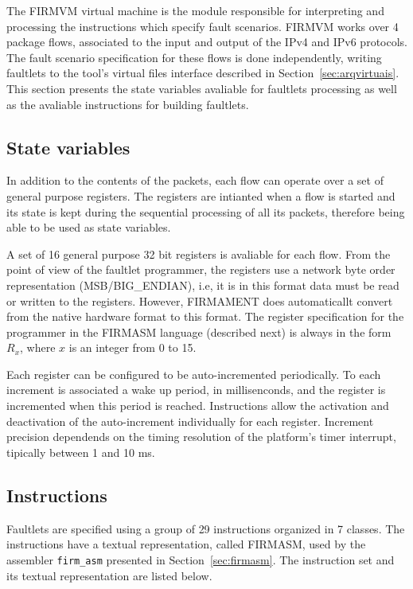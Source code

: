 \documentclass[11pt]{article}
\begin{document}
The \textsf{FIRMVM} virtual machine is the module responsible for interpreting and processing the instructions which specify fault scenarios. \textsf{FIRMVM} works over 4 package flows, associated to the input and output of the IPv4 and IPv6 protocols. The fault scenario specification for these flows is done independently, writing faultlets to the tool's virtual files interface described in Section~\ref{sec:arqvirtuais}. This section presents the state variables  avaliable for faultlets processing as well as the avaliable instructions for building faultlets.

\subsection{State variables}
 
In addition to the contents of the packets, each flow can operate over a set of general purpose registers. The registers are intianted when a flow is started and its state is kept during the sequential processing of all its packets, therefore being able to be used as state variables. 

A set of 16 general purpose 32 bit registers is avaliable for each flow. From the point of view of the faultlet programmer, the registers use a network byte order representation (MSB/BIG\_ENDIAN), i.e, it is in this format data must be read or written to the registers. However, \textsf{FIRMAMENT} does automaticallt convert from the native hardware format to this format. The register specification for the programmer in the \textsf{FIRMASM} language (described next) is always in the form $R_x$, where $x$ is an integer from 0 to 15.

Each register can be configured to be auto-incremented periodically. To each increment is associated a wake up period, in millisenconds, and the register is incremented when this period is reached. Instructions allow the activation and deactivation of the auto-increment individually for each register. Increment precision dependends on the timing resolution of the platform's timer interrupt, tipically between 1 and 10 ms.

\subsection{Instructions}

Faultlets are specified using a group of 29 instructions organized in 7 classes. The instructions have a textual representation, called \textsf{FIRMASM}, used by the assembler \texttt{firm\_asm} presented in Section~\ref{sec:firmasm}. The instruction set and its textual representation are listed below.
\end{document}
